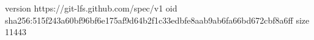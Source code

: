 version https://git-lfs.github.com/spec/v1
oid sha256:515f243a60bf96bf6e175af9d64b2f1c33edbfe8aab9ab6fa66bd672cbf8a6ff
size 11443
